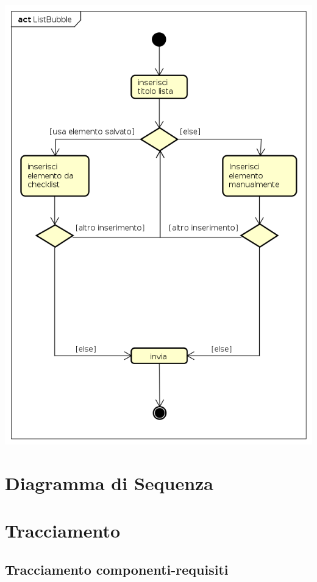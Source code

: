 \begin{center}
  \includegraphics[scale=0.5]{img/ListBubble.png}
\end{center}



\section{Diagramma di Sequenza}


\section{Tracciamento}

\subsection{Tracciamento componenti-requisiti}

